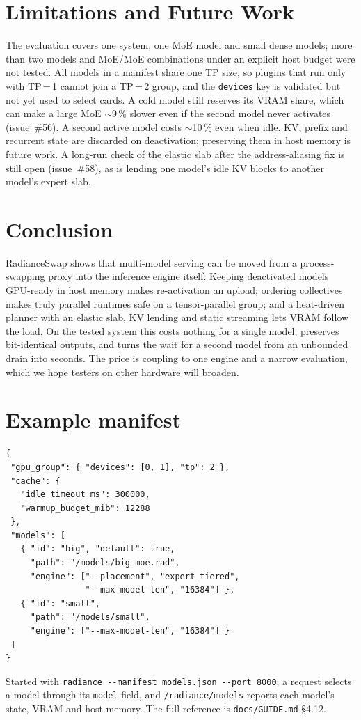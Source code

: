 \documentclass[10pt,conference,a4paper]{IEEEtran}
\newcommand{\code}[1]{\texttt{#1}}
\begin{document}
\section{Limitations and Future Work}

The evaluation covers one system, one MoE model and small dense models; more than two models and
MoE/MoE combinations under an explicit host budget were not tested. All models in a manifest share
one TP size, so plugins that run only with TP\,=\,1 cannot join a TP\,=\,2 group, and the
\code{devices} key is validated but not yet used to select cards. A cold model still reserves its VRAM
share, which can make a large MoE $\sim$9\,\% slower even if the second model never activates
(issue~\#56). A second active model costs $\sim$10\,\% even when idle. KV, prefix and recurrent state
are discarded on deactivation; preserving them in host memory is future work. A long-run check of
the elastic slab after the address-aliasing fix is still open (issue~\#58), as is lending one model's
idle KV blocks to another model's expert slab.

\section{Conclusion}

RadianceSwap shows that multi-model serving can be moved from a process-swapping proxy into the
inference engine itself. Keeping deactivated models GPU-ready in host memory makes re-activation an
upload; ordering collectives makes truly parallel runtimes safe on a tensor-parallel group; and a
heat-driven planner with an elastic slab, KV lending and static streaming lets VRAM follow the load.
On the tested system this costs nothing for a single model, preserves bit-identical outputs, and
turns the wait for a second model from an unbounded drain into seconds. The price is coupling to one
engine and a narrow evaluation, which we hope testers on other hardware will broaden.

\appendices
\section{Example manifest}
\begin{lstlisting}
{
 "gpu_group": { "devices": [0, 1], "tp": 2 },
 "cache": {
   "idle_timeout_ms": 300000,
   "warmup_budget_mib": 12288
 },
 "models": [
   { "id": "big", "default": true,
     "path": "/models/big-moe.rad",
     "engine": ["--placement", "expert_tiered",
                "--max-model-len", "16384"] },
   { "id": "small",
     "path": "/models/small",
     "engine": ["--max-model-len", "16384"] }
 ]
}
\end{lstlisting}
Started with \code{radiance -{}-manifest models.json -{}-port 8000}; a request selects a model through
its \code{model} field, and \code{/radiance/models} reports each model's state, VRAM and host
memory. The full reference is \code{docs/GUIDE.md} \S4.12.
\end{document}
